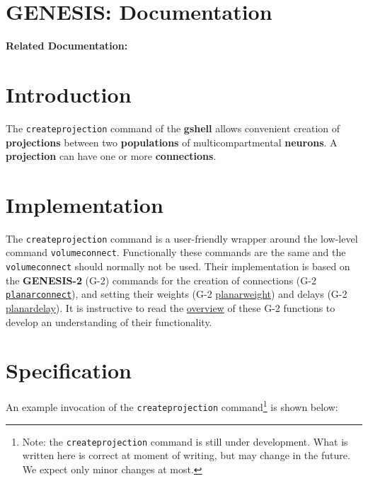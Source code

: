 \documentclass[12pt]{article}
\begin{document}
\section*{GENESIS: Documentation}

{\bf Related Documentation:} \\

\section*{Introduction}

The {\tt createprojection} command of the {\bf gshell} allows
convenient creation of {\bf projections} between two {\bf populations}
of multicompartmental {\bf neurons}.  A {\bf projection} can have one
or more {\bf connections}.

\section*{Implementation}

The {\tt createprojection} command is a user-friendly wrapper around
the low-level command {\tt volumeconnect}.  Functionally these
commands are the same and the {\tt volumeconnect} should normally not
be used.  Their implementation is based on the {\bf GENESIS-2} (G-2)
commands for the creation of connections (G-2
\href{http://www.genesis-sim.org/GENESIS/UGTD/Tutorials/genprog/textDoc/planarconnect.doc.txt}{
  {\tt planarconnect}}), and setting their weights (G-2
\href{http://www.genesis-sim.org/GENESIS/UGTD/Tutorials/genprog/textDoc/planarweight.doc.txt}{
  {planarweight}}) and delays (G-2
\href{http://www.genesis-sim.org/GENESIS/UGTD/Tutorials/genprog/textDoc/planardelay.doc.txt}{
  {planardelay}}).  It is instructive to read the
\href{http://www.genesis-sim.org/GENESIS/UGTD/Tutorials/genprog/net-tut.html}{overview}
of these G-2 functions to develop an understanding of their
functionality.


\section*{Specification}

An example invocation of the {\tt createprojection}
command\footnote{Note: the {\tt createprojection} command is still
  under development.  What is written here is correct at moment of
  writing, but may change in the future.  We expect only minor changes
  at most.} is shown below:
\end{document}

